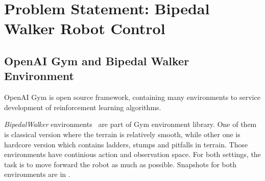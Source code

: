 \section{Problem Statement: Bipedal Walker Robot Control}
\label{sec:problem_statement}


\subsection{OpenAI Gym and Bipedal Walker Environment}
\label{ssec:gym_bipedal}

OpenAI Gym \cite{brockman_openai_2016} is open source framework, 
containing many environments to service development of 
reinforcement learning algorithms. 

\textit{BipedalWalker} environments~\cite{noauthor_bipedalwalker-v2_2021, noauthor_bipedalwalkerhardcore-v2_2021} are part of Gym environment library. 
One of them is classical version where the terrain is relatively smooth, while other one is hardcore version which contains ladders, stumps and pitfalls in terrain. 
Those environments have continious action and observation space. 
For both settings, the task is to move forward the robot as much as possible. 
Snapshots for both environments are in .
